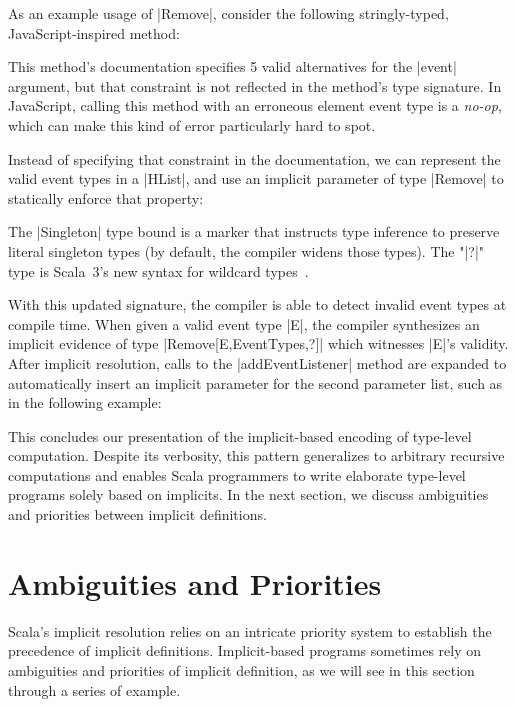 As an example usage of |Remove|, consider the following stringly-typed, JavaScript-inspired method:

\addEventListenerJS

\noindent
This method's documentation specifies 5 valid alternatives for the |event| argument, but that constraint is not reflected in the method's type signature.
In JavaScript, calling this method with an erroneous element event type is a \emph{no-op}, which can make this kind of error particularly hard to spot.

Instead of specifying that constraint in the documentation, we can represent the valid event types in a |HList|, and use an implicit parameter of type |Remove| to statically enforce that property:

\addEventListenerImplicitDef

\noindent
The |Singleton| type bound is a marker that instructs type inference to preserve literal singleton types (by default, the compiler widens those types).
The "|?|" type is Scala~3's new syntax for wildcard types~\citep[Wildcard Arguments in Types]{odersky2013scala}.

With this updated signature, the compiler is able to detect invalid event types at compile time.
When given a valid event type |E|, the compiler synthesizes an implicit evidence of type |Remove[E,EventTypes,?]| which witnesses |E|'s validity.
After implicit resolution, calls to the |addEventListener| method are expanded to automatically insert an implicit parameter for the second parameter list, such as in the following example:

\addEventListenerImplicitCall

This concludes our presentation of the implicit-based encoding of type-level computation.
Despite its verbosity, this pattern generalizes to arbitrary recursive computations and enables Scala programmers to write elaborate type-level programs solely based on implicits.
In the next section, we discuss ambiguities and priorities between implicit definitions.

\section{Ambiguities and Priorities}

Scala's implicit resolution relies on an intricate priority system to establish the precedence of implicit definitions.
Implicit-based programs sometimes rely on ambiguities and priorities of implicit definition, as we will see in this section through a series of example.

